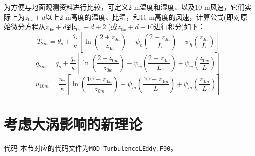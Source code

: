 为方便与地面观测资料进行比较，可定义2 m温度和湿度、以及10 m风速，它们实际上为$z_{0x}+d$以上2 m高度的温度、比湿，和10 m高度的风速，计算公式(即对原始微分方程从$z_{0x}+d$到$z_{0x}+d+2$ (或$z_{0x}+d+10$进行积分)如下：
\begin{equation}\label{T2m}
T_{2 m}=\theta_{s}+\frac{\theta_{*}}{\kappa}\left[\ln \left(\frac{2+z_{0 h}}{z_{0 h}}\right)-\psi_{h}\left(\frac{2+z_{0 h}}{L}\right)+\psi_{h}\left(\frac{z_{0 h}}{L}\right)\right]
\end{equation}
\begin{equation}\label{q2m}
q_{2 m}=q_{s}+\frac{q_{*}}{\kappa}\left[\ln \left(\frac{2+z_{0 w}}{z_{0 w}}\right)-\psi_{w}\left(\frac{2+z_{0 w}}{L}\right)+\psi_{w}\left(\frac{z_{0 w}}{L}\right)\right]
\end{equation}
\begin{equation}\label{u10m}
u_{10 m}=\frac{u_{*}}{\kappa}\left[\ln \left(\frac{10+z_{0 m}}{z_{0 m}}\right)-\psi_{m}\left(\frac{10+z_{0 m}}{L}\right)+\psi_{m}\left(\frac{z_{0 m}}{L}\right)\right]
\end{equation}


\section{考虑大涡影响的新理论}\label{考虑大涡影响的新理论}
\begin{mymdframed}{代码}
本节对应的代码文件为\texttt{MOD\_TurbulenceLEddy.F90}。
\end{mymdframed}


